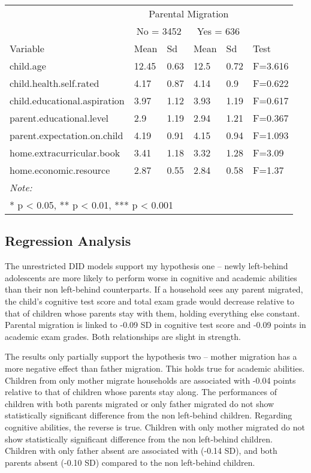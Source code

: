 \documentclass[
  man,floatsintext]{apa7}
\begin{document}
\newpage

\begin{tabular}{llllll}
\toprule
\multicolumn{1}{c}{ } & \multicolumn{4}{c}{Parental Migration} \\
\cmidrule(l{3pt}r{3pt}){2-5}
\multicolumn{1}{c}{ } & \multicolumn{2}{c}{No = 3452} & \multicolumn{2}{c}{Yes = 636} \\
\cmidrule(l{3pt}r{3pt}){2-3} \cmidrule(l{3pt}r{3pt}){4-5}
Variable & Mean & Sd & Mean & Sd & Test\\
\midrule
child.age & 12.45 & 0.63 & 12.5 & 0.72 & F=3.616\\
child.health.self.rated & 4.17 & 0.87 & 4.14 & 0.9 & F=0.622\\
child.educational.aspiration & 3.97 & 1.12 & 3.93 & 1.19 & F=0.617\\
parent.educational.level & 2.9 & 1.19 & 2.94 & 1.21 & F=0.367\\
parent.expectation.on.child & 4.19 & 0.91 & 4.15 & 0.94 & F=1.093\\
\addlinespace
home.extracurricular.book & 3.41 & 1.18 & 3.32 & 1.28 & F=3.09\\
home.economic.resource & 2.87 & 0.55 & 2.84 & 0.58 & F=1.37\\
\bottomrule
\multicolumn{6}{l}{\rule{0pt}{1em}\textit{Note: }}\\
\multicolumn{6}{l}{\rule{0pt}{1em}* p < 0.05, ** p < 0.01, *** p < 0.001}\\
\end{tabular}

\hypertarget{regression-analysis}{%
\subsection{Regression Analysis}\label{regression-analysis}}

The unrestricted DID models support my hypothesis one -- newly left-behind adolescents are more likely to perform worse in cognitive and academic abilities than their non left-behind counterparts. If a household sees any parent migrated, the child's cognitive test score and total exam grade would decrease relative to that of children whose parents stay with them, holding everything else constant. Parental migration is linked to -0.09 SD in cognitive test score and -0.09 points in academic exam grades. Both relationships are slight in strength.

The results only partially support the hypothesis two -- mother migration has a more negative effect than father migration. This holds true for academic abilities. Children from only mother migrate households are associated with -0.04 points relative to that of children whose parents stay along. The performances of children with both parents migrated or only father migrated do not show statistically significant difference from the non left-behind children. Regarding cognitive abilities, the reverse is true. Children with only mother migrated do not show statistically significant difference from the non left-behind children. Children with only father absent are associated with (-0.14 SD), and both parents absent (-0.10 SD) compared to the non left-behind children.
\end{document}
